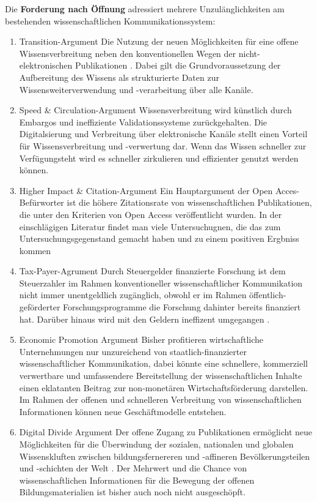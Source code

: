 Die \textbf{Forderung nach Öffnung} adressiert mehrere Unzulänglichkeiten am bestehenden wissenschaftlichen Kommunikationssystem:
\begin{enumerate}
\item Transition-Argument
Die Nutzung der neuen Möglichkeiten für eine offene Wissensverbreitung neben den konventionellen Wegen der nicht-elektronischen Publikationen . Dabei gilt die Grundvoraussetzung der Aufbereitung des Wissens als strukturierte Daten zur Wissensweiterverwendung und -verarbeitung über alle Kanäle.
\item Speed & Circulation-Argument
Wissensverbreitung wird künstlich durch Embargos und ineffiziente Validationssysteme zurückgehalten. Die Digitalsierung und Verbreitung über elektronische Kanäle stellt einen Vorteil für Wissensverbreitung und -verwertung dar. Wenn das Wissen schneller zur Verfügungsteht wird es schneller zirkulieren und effizienter genutzt werden können.  
\item Higher Impact & Citation-Argument
Ein Hauptargument der Open Acces-Befürworter ist die höhere Zitationsrate von wissenschaftlichen Publikationen, die unter den Kriterien von Open Access veröffentlicht wurden\cite{cite:21a}. In der einschlägigen Literatur findet man viele Untersuchugnen, die das zum Untersuchungsgegenstand gemacht haben und zu einem positiven Ergbniss kommen \cite{Lawrence_2001}\cite{Jeffrey_2008}\cite{Eysenbach_2006}\cite{Antelman_2004}
\item Tax-Payer-Agrument
Durch Steuergelder finanzierte Forschung ist dem Steuerzahler im Rahmen konventioneller wissenschaftlicher Kommunikation nicht immer unentgeldlich zugänglich, obwohl er im Rahmen öffentlich-geförderter Forschungsprogramme die Forschung dahinter bereits finanziert hat. Darüber hinaus wird mit den Geldern ineffizent umgegangen \cite{Glasziou_2014} \cite{altman_1994_scandal}.
\item Economic Promotion Argument
Bisher profitieren wirtschaftliche Unternehmungen nur unzureichend von staatlich-finanzierter wissenschaftlicher Kommunikation, dabei könnte eine schnellere, kommerziell verwertbare und umfassendere Bereitstellung der wissenschaftlichen Inhalte einen eklatanten Beitrag zur non-monetären Wirtschaftsförderung darstellen. Im Rahmen der offenen und schnelleren Verbreitung von wissenschaftlichen Informationen können neue Geschäftmodelle entstehen.
\item Digital Divide Argument
Der offene Zugang zu Publikationen ermöglicht neue Möglichkeiten für die Überwindung der sozialen, nationalen und globalen Wissenskluften  zwischen bildungsfernereren und -affineren Bevölkerungsteilen und -schichten der Welt . Der Mehrwert und die Chance von wissenschaftlichen Informationen für die Bewegung der offenen Bildungsmaterialien ist bisher auch noch nicht ausgeschöpft\cite{heise_lernen_2013}.

\end{enumerate}
